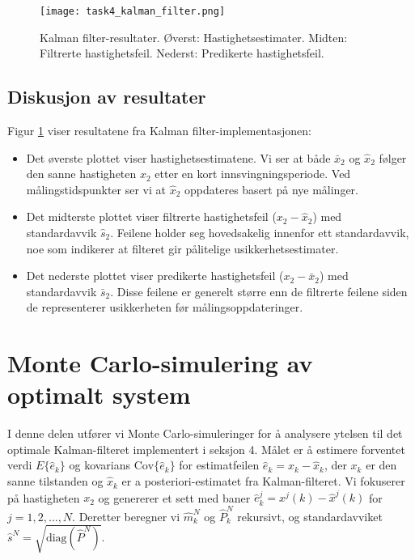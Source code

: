 \documentclass[a4paper,12pt]{article}
\theoremstyle{plain}
\begin{document}
\begin{figure}[ht]
    \centering
    \texttt{[image: task4\_kalman\_filter.png]}
    \caption{Kalman filter-resultater. Øverst: Hastighetsestimater. Midten: Filtrerte hastighetsfeil. Nederst: Predikerte hastighetsfeil.}
    \label{fig:kalman_filter}
\end{figure}
\clearpage
\subsection{Diskusjon av resultater}

Figur \ref{fig:kalman_filter} viser resultatene fra Kalman filter-implementasjonen:

\begin{itemize}
    \item Det øverste plottet viser hastighetsestimatene. Vi ser at både $\bar{x}_2$ og $\hat{x}_2$ følger den sanne hastigheten $x_2$ etter en kort innsvingningsperiode. Ved målingstidspunkter ser vi at $\hat{x}_2$ oppdateres basert på nye målinger.
    
    \item Det midterste plottet viser filtrerte hastighetsfeil ($x_2 - \hat{x}_2$) med standardavvik $\hat{s}_2$. Feilene holder seg hovedsakelig innenfor ett standardavvik, noe som indikerer at filteret gir pålitelige usikkerhetsestimater.
    
    \item Det nederste plottet viser predikerte hastighetsfeil ($x_2 - \bar{x}_2$) med standardavvik $\bar{s}_2$. Disse feilene er generelt større enn de filtrerte feilene siden de representerer usikkerheten før målingsoppdateringer.
\end{itemize}
\clearpage
\section{Monte Carlo-simulering av optimalt system}
I denne delen utfører vi Monte Carlo-simuleringer for å analysere ytelsen til det optimale Kalman-filteret implementert i seksjon 4. Målet er å estimere forventet verdi $E\{\hat{e}_k\}$ og kovarians $\text{Cov}\{\hat{e}_k\}$ for estimatfeilen $\hat{e}_k = x_k - \hat{x}_k$, der $x_k$ er den sanne tilstanden og $\hat{x}_k$ er a posteriori-estimatet fra Kalman-filteret. Vi fokuserer på hastigheten $x_2$ og genererer et sett med baner $\hat{e}_k^j = x^j(k) - \hat{x}^j(k)$ for $j=1, 2, \ldots, N$. Deretter beregner vi $\hat{m}_k^N$ og $\hat{P}_k^N$ rekursivt, og standardavviket $\hat{s}^N = \sqrt{\text{diag}(\hat{P}^N)}$.
\end{document}
